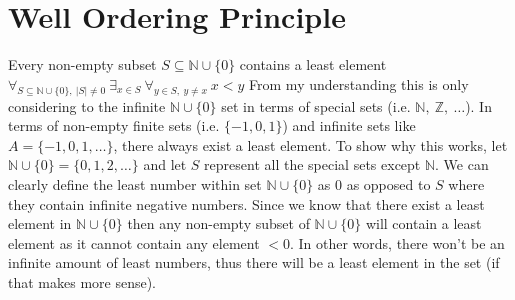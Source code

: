 \documentclass[12pt]{article}
\begin{document}
    \section*{Well Ordering Principle}
    Every non-empty subset $S \subseteq \mathbb{N} \cup \{0\}$ contains a least element \newline
    $\forall_{S \subseteq \mathbb{N} \cup \{0\}, \ |S| \neq  0} \ \exists_{x \in S} \ \forall_{y \in S,\ y\neq x} \ x < y$\newline 
    From my understanding this is only considering to the infinite $\mathbb{N}\cup\{0\}$ set in terms of special sets 
    (i.e. $\mathbb{N}, \ \mathbb{Z}, \ \ldots$). In terms of non-empty finite sets (i.e. $\{-1, 0, 1\}$) and infinite sets like
    $A = \{-1,0,1, \ldots\}$, there  always exist a least element. To show why this works, let 
   $\mathbb{N} \cup \{0\} = \{0, 1, 2, \ldots\}$ and let $S$ represent all the special sets except $\mathbb{N}$.
    We can clearly define the least number within set $\mathbb{N} \cup \{0\}$ as $0$ as opposed to $S$ where they 
    contain infinite negative numbers. Since we know that there exist a least element in $\mathbb{N} \cup \{0\}$
    then any non-empty subset of $\mathbb{N} \cup \{0\}$ will contain a least element as 
    it cannot contain any element $ < 0$. In other words, there won't be an infinite amount of least numbers,
    thus there will be a least element in the set (if that makes more sense).
\end{document}
